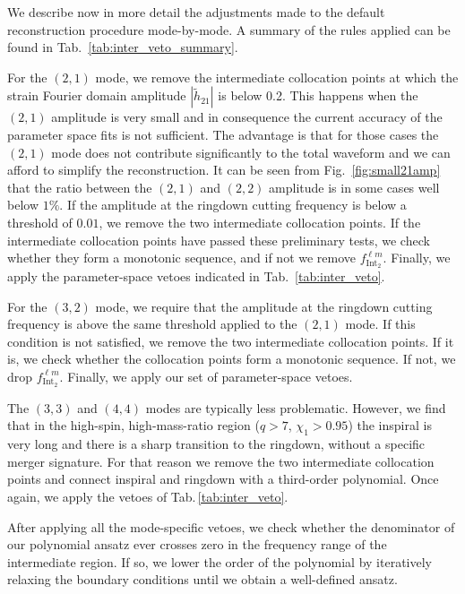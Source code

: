 \documentclass[twocolumn,prd,aps,superscriptaddress,preprintnumbers,tightenlines,showpacs,nofootinbib,eqsecnum,amsfonts,amsmath]{revtex4}
\begin{document}
We describe now in more detail the adjustments made to the default reconstruction procedure mode-by-mode. A summary of the rules applied can be found in Tab.~\ref{tab:inter_veto_summary}.
%

For the $(2,1)$ mode, we remove the intermediate collocation points at which the strain Fourier domain amplitude $|\tilde{h}_{21}|$ is below 0.2. This happens when the $(2,1)$ amplitude is very small and in consequence the current accuracy of the parameter space fits is not sufficient. The advantage is that for those cases the $(2,1)$ mode does not contribute significantly to the total waveform and we can afford to simplify the reconstruction. It can be seen from Fig.~\ref{fig:small21amp} that the ratio between the $(2,1)$ and $(2,2)$ amplitude is in some cases well below $1\%$. If the amplitude at the ringdown cutting frequency is below a threshold of $0.01$, we remove the two intermediate collocation points.
If the intermediate collocation points have passed these preliminary tests, we check whether they form a monotonic sequence, and if not we remove $f_{\mathrm{Int}_{2}}^{\ell m}$. Finally, we apply the parameter-space vetoes indicated in Tab.~\ref{tab:inter_veto}.

For the $(3,2)$ mode, we require that the amplitude at the ringdown cutting frequency is above the same threshold applied to the $(2,1)$ mode. If this condition is not satisfied, we remove the two intermediate collocation points. If it is, we check whether the collocation points form a monotonic sequence. If not, we drop $f_{\mathrm{Int}_{2}}^{\ell m}$. Finally, we apply our set of parameter-space vetoes.%

The $(3,3)$ and $(4,4)$ modes are typically less problematic. However, we find that in the high-spin, high-mass-ratio region ($q>7$, $\chi_1>0.95$)
the inspiral is very long and there is a sharp transition to the ringdown, without a specific merger signature. For that reason we remove the two intermediate collocation points and connect inspiral and ringdown with a third-order polynomial. Once again, we apply the vetoes of Tab.\,\ref{tab:inter_veto}.

After applying all the mode-specific vetoes, we check whether the denominator of our polynomial ansatz ever crosses zero in the frequency range of the intermediate region. If so, we lower the order of the polynomial by iteratively relaxing the boundary conditions until we obtain a well-defined ansatz. 
\end{document}
